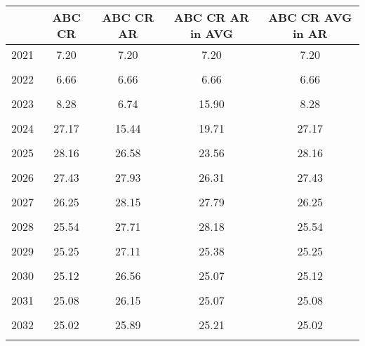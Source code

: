 \begin{tabular}{l*{4}{c}}
\hline\hline
                &   ABC CR&ABC CR AR&ABC CR AR in AVG&ABC CR AVG in AR\\
\hline
2021            &     7.20&     7.20&     7.20&     7.20\\
                &         &         &         &         \\
2022            &     6.66&     6.66&     6.66&     6.66\\
                &         &         &         &         \\
2023            &     8.28&     6.74&    15.90&     8.28\\
                &         &         &         &         \\
2024            &    27.17&    15.44&    19.71&    27.17\\
                &         &         &         &         \\
2025            &    28.16&    26.58&    23.56&    28.16\\
                &         &         &         &         \\
2026            &    27.43&    27.93&    26.31&    27.43\\
                &         &         &         &         \\
2027            &    26.25&    28.15&    27.79&    26.25\\
                &         &         &         &         \\
2028            &    25.54&    27.71&    28.18&    25.54\\
                &         &         &         &         \\
2029            &    25.25&    27.11&    25.38&    25.25\\
                &         &         &         &         \\
2030            &    25.12&    26.56&    25.07&    25.12\\
                &         &         &         &         \\
2031            &    25.08&    26.15&    25.07&    25.08\\
                &         &         &         &         \\
2032            &    25.02&    25.89&    25.21&    25.02\\
                &         &         &         &         \\
\hline\hline
\end{tabular}
